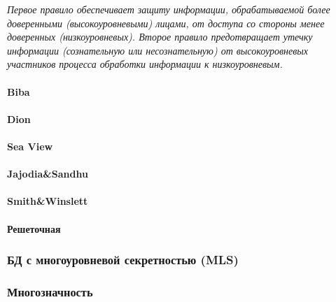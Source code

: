 \textit{Первое правило обеспечивает защиту информации, обрабатываемой более доверенными 
(высокоуровневыми) лицами, от доступа со стороны менее доверенных (низкоуровневых). Второе правило 
предотвращает утечку информации (сознательную или несознательную) от высокоуровневых участников 
процесса обработки информации к низкоуровневым.}

\paragraph{Biba}
\paragraph{Dion}
\paragraph{Sea View}
\paragraph{Jajodia\&Sandhu}
\paragraph{Smith\&Winslett}
\paragraph{Решеточная}

\subsubsection{БД с многоуровневой секретностью (MLS)}
\subsubsection{Многозначность}